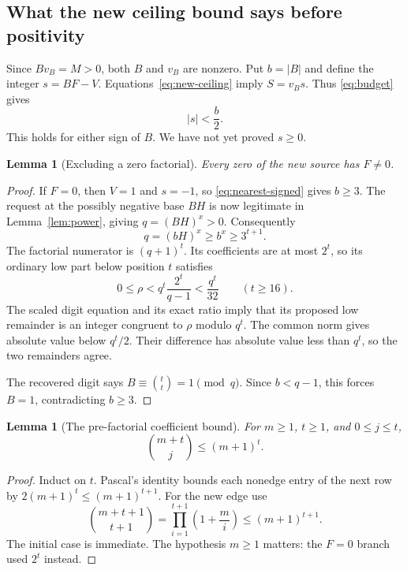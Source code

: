 \documentclass[11pt,letterpaper]{article}
\newtheorem{lemma}[theorem]{Lemma}
\theoremstyle{remark}\newtheorem{remark}[theorem]{Remark}
\begin{document}
\subsection{What the new ceiling bound says before positivity}
Since $Bv_B=M>0$, both $B$ and $v_B$ are nonzero. Put $b=|B|$ and define the integer $s=BF-V$. Equations~\eqref{eq:new-ceiling} imply $S=v_Bs$. Thus \eqref{eq:budget} gives
\begin{equation}\label{eq:nearest-signed}
 |s|<\frac b2.
\end{equation}
This holds for either sign of $B$. We have not yet proved $s\ge0$.

\begin{lemma}[Excluding a zero factorial]\label{lem:Fzero}
Every zero of the new source has $F\ne0$.
\end{lemma}
\begin{proof}
If $F=0$, then $V=1$ and $s=-1$, so \eqref{eq:nearest-signed} gives $b\ge3$. The request at the possibly negative base $BH$ is now legitimate in Lemma~\ref{lem:power}, giving $q=(BH)^x>0$. Consequently
\[
 q=(bH)^x\ge b^x\ge3^{t+1}.
\]
The factorial numerator is $(q+1)^t$. Its coefficients are at most $2^t$, so its ordinary low part below position $t$ satisfies
\[
 0\le\rho<q^t\frac{2^t}{q-1}<\frac{q^t}{32}
 \qquad(t\ge16).
\]
The scaled digit equation and its exact ratio imply that its proposed low remainder is an integer congruent to $\rho$ modulo $q^t$. The common norm gives absolute value below $q^t/2$. Their difference has absolute value less than $q^t$, so the two remainders agree.

The recovered digit says $B\equiv\binom tt=1\pmod q$. Since $b<q-1$, this forces $B=1$, contradicting $b\ge3$.
\end{proof}

\begin{lemma}[The pre-factorial coefficient bound]\label{lem:coeff}
For $m\ge1$, $t\ge1$, and $0\le j\le t$,
\[
 \binom{m+t}{j}\le(m+1)^t.
\]
\end{lemma}
\begin{proof}
Induct on $t$. Pascal's identity bounds each nonedge entry of the next row by $2(m+1)^t\le(m+1)^{t+1}$. For the new edge use
\[
 \binom{m+t+1}{t+1}=\prod_{i=1}^{t+1}\left(1+\frac mi\right)\le(m+1)^{t+1}.
\]
The initial case is immediate. The hypothesis $m\ge1$ matters: the $F=0$ branch used $2^t$ instead.
\end{proof}
\end{document}
